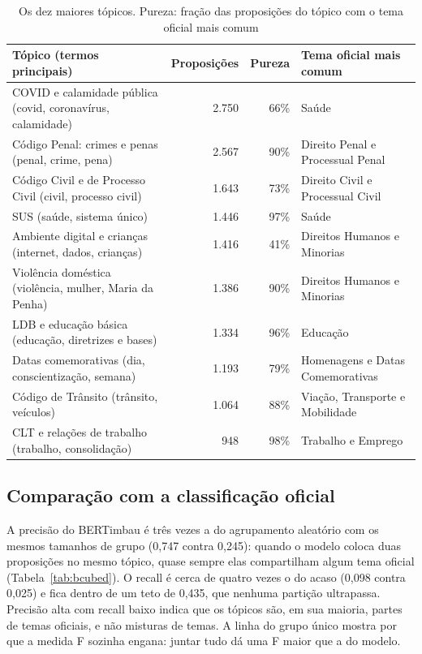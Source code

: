\begin{table}[H]
\centering
\caption{Os dez maiores tópicos. Pureza: fração das proposições do tópico com o tema oficial mais comum}
\label{tab:maiores}
\small
\begin{tabularx}{\textwidth}{>{\raggedright\arraybackslash}X r r >{\raggedright\arraybackslash}p{4.8cm}}
\toprule
\textbf{Tópico (termos principais)} & \textbf{Proposições} & \textbf{Pureza} & \textbf{Tema oficial mais comum} \\
\midrule
COVID e calamidade pública (covid, coronavírus, calamidade) & 2.750 & 66\% & Saúde \\
Código Penal: crimes e penas (penal, crime, pena) & 2.567 & 90\% & Direito Penal e Processual Penal \\
Código Civil e de Processo Civil (civil, processo civil) & 1.643 & 73\% & Direito Civil e Processual Civil \\
SUS (saúde, sistema único) & 1.446 & 97\% & Saúde \\
Ambiente digital e crianças (internet, dados, crianças) & 1.416 & 41\% & Direitos Humanos e Minorias \\
Violência doméstica (violência, mulher, Maria da Penha) & 1.386 & 90\% & Direitos Humanos e Minorias \\
LDB e educação básica (educação, diretrizes e bases) & 1.334 & 96\% & Educação \\
Datas comemorativas (dia, conscientização, semana) & 1.193 & 79\% & Homenagens e Datas Comemorativas \\
Código de Trânsito (trânsito, veículos) & 1.064 & 88\% & Viação, Transporte e Mobilidade \\
CLT e relações de trabalho (trabalho, consolidação) & 948 & 98\% & Trabalho e Emprego \\
\bottomrule
\end{tabularx}
\end{table}

\subsection{Comparação com a classificação oficial}
\label{subsec:res-bcubed}

A precisão do BERTimbau é três vezes a do agrupamento aleatório com os mesmos tamanhos de grupo (0,747 contra 0,245): quando o modelo coloca duas proposições no mesmo tópico, quase sempre elas compartilham algum tema oficial (Tabela~\ref{tab:bcubed}). O recall é cerca de quatro vezes o do acaso (0,098 contra 0,025) e fica dentro de um teto de 0,435, que nenhuma partição ultrapassa. Precisão alta com recall baixo indica que os tópicos são, em sua maioria, partes de temas oficiais, e não misturas de temas. A linha do grupo único mostra por que a medida F sozinha engana: juntar tudo dá uma F maior que a do modelo.

